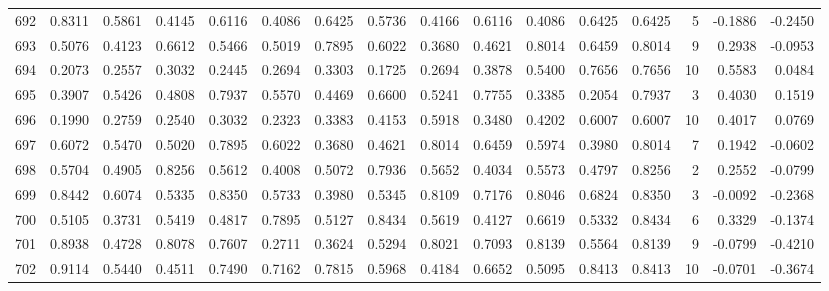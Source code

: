 \begin{tabular}{lrrrrrrrrrrrrrrr}
692 &      0.8311 &  0.5861 &  0.4145 &  0.6116 &  0.4086 &  0.6425 &  0.5736 &  0.4166 &  0.6116 &  0.4086 &   0.6425 &     0.6425 &      5 &                   -0.1886 &                    -0.2450 \\
693 &      0.5076 &  0.4123 &  0.6612 &  0.5466 &  0.5019 &  0.7895 &  0.6022 &  0.3680 &  0.4621 &  0.8014 &   0.6459 &     0.8014 &      9 &                    0.2938 &                    -0.0953 \\
694 &      0.2073 &  0.2557 &  0.3032 &  0.2445 &  0.2694 &  0.3303 &  0.1725 &  0.2694 &  0.3878 &  0.5400 &   0.7656 &     0.7656 &     10 &                    0.5583 &                     0.0484 \\
695 &      0.3907 &  0.5426 &  0.4808 &  0.7937 &  0.5570 &  0.4469 &  0.6600 &  0.5241 &  0.7755 &  0.3385 &   0.2054 &     0.7937 &      3 &                    0.4030 &                     0.1519 \\
696 &      0.1990 &  0.2759 &  0.2540 &  0.3032 &  0.2323 &  0.3383 &  0.4153 &  0.5918 &  0.3480 &  0.4202 &   0.6007 &     0.6007 &     10 &                    0.4017 &                     0.0769 \\
697 &      0.6072 &  0.5470 &  0.5020 &  0.7895 &  0.6022 &  0.3680 &  0.4621 &  0.8014 &  0.6459 &  0.5974 &   0.3980 &     0.8014 &      7 &                    0.1942 &                    -0.0602 \\
698 &      0.5704 &  0.4905 &  0.8256 &  0.5612 &  0.4008 &  0.5072 &  0.7936 &  0.5652 &  0.4034 &  0.5573 &   0.4797 &     0.8256 &      2 &                    0.2552 &                    -0.0799 \\
699 &      0.8442 &  0.6074 &  0.5335 &  0.8350 &  0.5733 &  0.3980 &  0.5345 &  0.8109 &  0.7176 &  0.8046 &   0.6824 &     0.8350 &      3 &                   -0.0092 &                    -0.2368 \\
700 &      0.5105 &  0.3731 &  0.5419 &  0.4817 &  0.7895 &  0.5127 &  0.8434 &  0.5619 &  0.4127 &  0.6619 &   0.5332 &     0.8434 &      6 &                    0.3329 &                    -0.1374 \\
701 &      0.8938 &  0.4728 &  0.8078 &  0.7607 &  0.2711 &  0.3624 &  0.5294 &  0.8021 &  0.7093 &  0.8139 &   0.5564 &     0.8139 &      9 &                   -0.0799 &                    -0.4210 \\
702 &      0.9114 &  0.5440 &  0.4511 &  0.7490 &  0.7162 &  0.7815 &  0.5968 &  0.4184 &  0.6652 &  0.5095 &   0.8413 &     0.8413 &     10 &                   -0.0701 &                    -0.3674 \\

\end{tabular}
